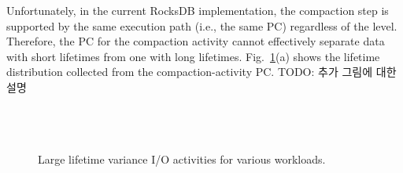 Unfortunately, in the current RocksDB implementation, the compaction step is supported 
by the same execution path (i.e., the same PC) regardless of the level.
Therefore, the PC for the compaction activity cannot effectively separate data with 
short lifetimes from one with long lifetimes.
Fig.~\ref{fig:compaction}(a) shows 
the lifetime distribution collected from the compaction-activity PC.  
{\color{red}TODO: 추가 그림에 대한설명 \\ \\ \\ \\ }

\begin{figure}[!t]
\centering
\hfill
{}%
	\hspace{2pt}
\hfill
\vspace{7pt}
	\hspace{2pt}
\caption{Large lifetime variance I/O activities for various workloads.} %
\label{fig:compaction}
\end{figure}

